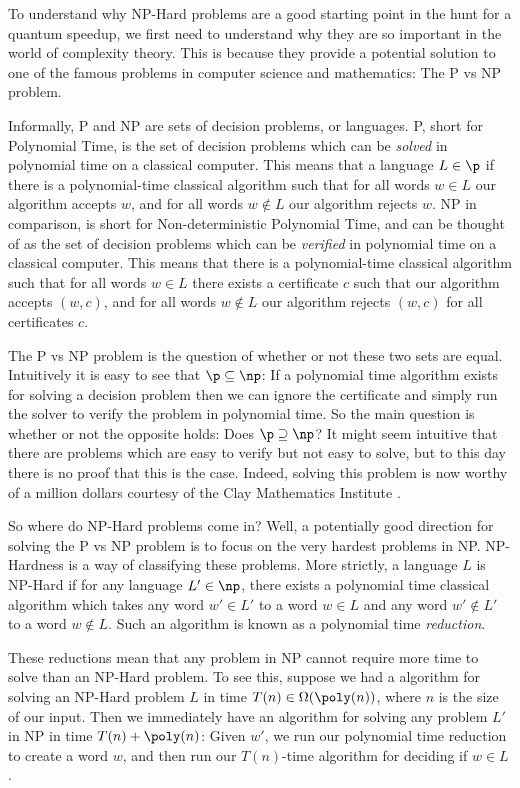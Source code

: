 To understand why NP-Hard problems are a good starting point in the hunt for a quantum speedup, we first need to understand why they are so important in the world of complexity theory. This is because they provide a potential solution to one of the famous problems in computer science and mathematics: The P vs NP problem.

Informally, P and NP are sets of decision problems, or languages. P, short for Polynomial Time, is the set of decision problems which can be \textit{solved} in polynomial time on a classical computer. This means that a language $L \in \p$ if there is a polynomial-time classical algorithm such that for all words $w \in L$ our algorithm accepts $w$, and for all words $w \notin L$ our algorithm rejects $w$. NP in comparison, is short for Non-deterministic Polynomial Time, and can be thought of as the set of decision problems which can be \textit{verified} in polynomial time on a classical computer. This means that there is a polynomial-time classical algorithm such that for all words $w \in L$ there exists a certificate $c$ such that our algorithm accepts $(w,c)$, and for all words $w \notin L$ our algorithm rejects $(w,c)$ for all certificates $c$.

The P vs NP problem is the question of whether or not these two sets are equal. Intuitively it is easy to see that $\p \subseteq \np$: If a polynomial time algorithm exists for solving a decision problem then we can ignore the certificate and simply run the solver to verify the problem in polynomial time. So the main question is whether or not the opposite holds: Does $\p \supseteq \np$? It might seem intuitive that there are problems which are easy to verify but not easy to solve, but to this day there is no proof that this is the case. Indeed, solving this problem is now worthy of a million dollars courtesy of the Clay Mathematics Institute \cite{cmipvsnp}.

So where do NP-Hard problems come in? Well, a potentially good direction for solving the P vs NP problem is to focus on the very hardest problems in NP. NP-Hardness is a way of classifying these problems. More strictly, a language $L$ is NP-Hard if for any language $L' \in \np$, there exists a polynomial time classical algorithm which takes any word $w'\in L'$ to a word $w \in L$ and any word $w'\notin L'$ to a word $w \notin L$. Such an algorithm is known as a polynomial time \textit{reduction}.

These reductions mean that any problem in NP cannot require more time to solve than an NP-Hard problem. To see this, suppose we had a algorithm for solving an NP-Hard problem $L$ in time $T(n) \in \Omega(\poly(n))$, where $n$ is the size of our input. Then we immediately have an algorithm for solving any problem $L'$ in NP in time $T(n)+\poly(n)$: Given $w'$, we run our polynomial time reduction to create a word $w$, and then run our $T(n)$-time algorithm for deciding if $w \in L$.


